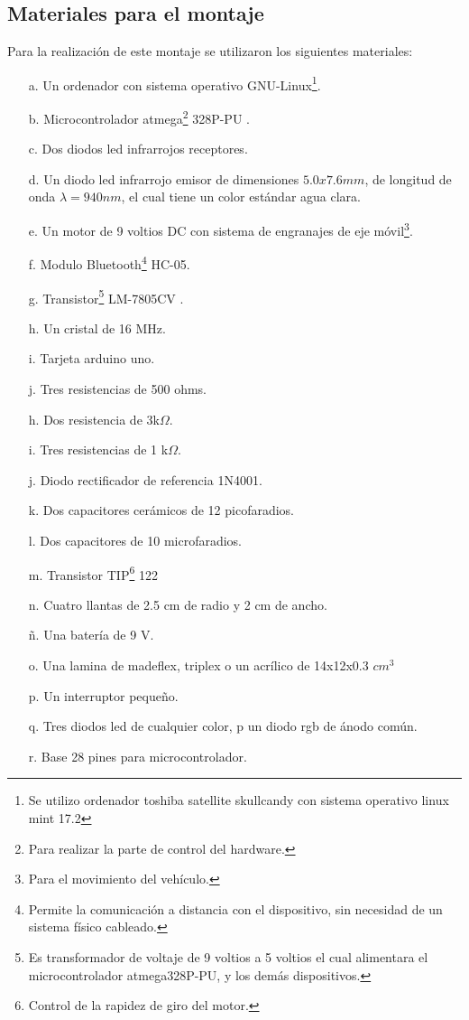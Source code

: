\documentclass[12]{article}
\begin{document}
\begin{multicols}{2}
\subsection{ Materiales para el montaje}
Para la realización de este montaje se utilizaron los siguientes materiales:
\begin{enumerate}
\item[a.] Un ordenador con sistema operativo GNU-Linux\footnote{Se utilizo ordenador toshiba satellite skullcandy con sistema operativo linux mint 17.2}.
\item[b.] Microcontrolador atmega\footnote{Para realizar la parte de control del hardware.} 328P-PU \cite{ARDUINO}.
\item[c.] Dos diodos led infrarrojos receptores.
\item[d.] Un diodo led infrarrojo emisor de dimensiones  $5.0x7.6 mm$, de longitud de onda $\lambda = 940 nm $,  el cual tiene un color estándar agua clara.
\item[e.] Un motor de 9 voltios DC con sistema de engranajes de eje móvil\footnote{Para el movimiento del vehículo.}.
\item[f.] Modulo Bluetooth\footnote{Permite la comunicación a distancia con el dispositivo, sin necesidad de un sistema físico cableado.} HC-05.
\item[g.] Transistor\footnote{Es transformador de voltaje de 9 voltios a 5 voltios el cual alimentara el microcontrolador atmega328P-PU, y los demás dispositivos.} LM-7805CV \cite{REGULADOR}.
\item[h.] Un cristal de 16 MHz.
\item[i.] Tarjeta arduino \cite{ARDUINO} uno.
\item[j.] Tres resistencias de 500 ohms.
\item[h.] Dos resistencia de 3k$\Omega$.
\item[i.] Tres resistencias de 1 k$\Omega$.
\item[j.] Diodo rectificador de referencia 1N4001. 
\item[k.] Dos capacitores cerámicos de 12 picofaradios.
\item[l.] Dos capacitores de 10 microfaradios.
\item[m.] Transistor TIP\footnote{Control de la rapidez de giro del motor.} 122\cite{TIP122}  
\item[n.] Cuatro llantas de 2.5 cm de radio y 2 cm de ancho.
\item[ñ.] Una batería de 9 V.
\item[o.] Una lamina de madeflex, triplex  o un acrílico de 14x12x0.3 $cm^{3}$
\item[p.] Un interruptor pequeño.
\item[q.] Tres diodos led de cualquier color, p un diodo rgb de ánodo común.
\item[r.] Base 28 pines para microcontrolador.
\end{enumerate}

\end{multicols}
\end{document}
